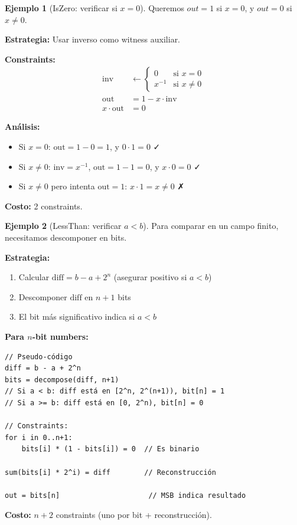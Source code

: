 \documentclass[11pt,a4paper,twoside,openright]{book}
\theoremstyle{definition}
\newtheorem{example}{Ejemplo}[chapter]
\theoremstyle{plain}
\theoremstyle{remark}
\begin{document}
\begin{example}[IsZero: verificar si $x = 0$]
Queremos $out = 1$ si $x = 0$, y $out = 0$ si $x \neq 0$.

\textbf{Estrategia:} Usar inverso como witness auxiliar.

\textbf{Constraints:}
\begin{align*}
\text{inv} &\leftarrow \begin{cases} 0 & \text{si } x = 0 \\ x^{-1} & \text{si } x \neq 0 \end{cases} \\
\text{out} &= 1 - x \cdot \text{inv} \\
x \cdot \text{out} &= 0
\end{align*}

\textbf{Análisis:}
\begin{itemize}
    \item Si $x = 0$: $\text{out} = 1 - 0 = 1$, y $0 \cdot 1 = 0$ ✓
    \item Si $x \neq 0$: $\text{inv} = x^{-1}$, $\text{out} = 1 - 1 = 0$, y $x \cdot 0 = 0$ ✓
    \item Si $x \neq 0$ pero intenta $\text{out} = 1$: $x \cdot 1 = x \neq 0$ ✗
\end{itemize}

\textbf{Costo:} 2 constraints.
\end{example}

\begin{example}[LessThan: verificar $a < b$]
Para comparar en un campo finito, necesitamos descomponer en bits.

\textbf{Estrategia:} 
\begin{enumerate}
    \item Calcular $\text{diff} = b - a + 2^n$ (asegurar positivo si $a < b$)
    \item Descomponer $\text{diff}$ en $n+1$ bits
    \item El bit más significativo indica si $a < b$
\end{enumerate}

\textbf{Para $n$-bit numbers:}
\begin{verbatim}
// Pseudo-código
diff = b - a + 2^n
bits = decompose(diff, n+1)
// Si a < b: diff está en [2^n, 2^(n+1)), bit[n] = 1
// Si a >= b: diff está en [0, 2^n), bit[n] = 0

// Constraints:
for i in 0..n+1:
    bits[i] * (1 - bits[i]) = 0  // Es binario
    
sum(bits[i] * 2^i) = diff        // Reconstrucción

out = bits[n]                     // MSB indica resultado
\end{verbatim}

\textbf{Costo:} $n + 2$ constraints (uno por bit + reconstrucción).
\end{example}
\end{document}
